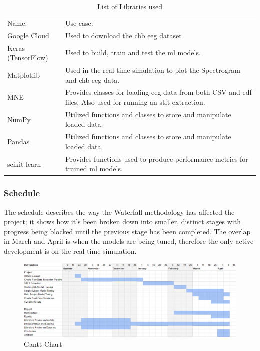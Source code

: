 \documentclass[12pt]{article}
\begin{document}
\begin{table}[H]
\centering
\begin{tabular}{p{}p{}}
Name:              & Use case:                                                                                                                               \\
Google Cloud       & Used to download the \acrshort{chb} \acrshort{eeg} dataset                                                                            \\
Keras (TensorFlow) & Used to build, train and test the \acrshort{ml} models.                                                                \\
Matplotlib         & Used in the real-time simulation to plot the Spectrogram and \acrshort{chb} \acrshort{eeg} data.                                       \\
MNE                & Provides classes for loading \acrshort{eeg} data from both CSV and \acrshort{edf} files. Also used for running an \acrfull{stft} extraction. \\
NumPy              & Utilized functions and classes to store and manipulate loaded data.                                                                     \\
Pandas             & Utilized functions and classes to store and manipulate loaded data.                                                                     \\
scikit-learn       & Provides functions used to produce performance metrics for trained \acrshort{ml} models.                              
\end{tabular}
\caption{List of Libraries used}
\label{tab:libraries}
\end{table}


\subsubsection{Schedule}\label{schedule}

The schedule describes the way the Waterfall methodology has affected the project; it shows how it's been broken down into smaller, distinct stages with progress being blocked until the previous stage has been completed. The overlap in March and April is when the models are being tuned, therefore the only active development is on the real-time simulation. 

\begin{figure}[H]
\includegraphics[width=\textwidth]{gantt}
\centering
\caption{Gantt Chart}
\label{fig:gantt}
\end{figure}
\end{document}
